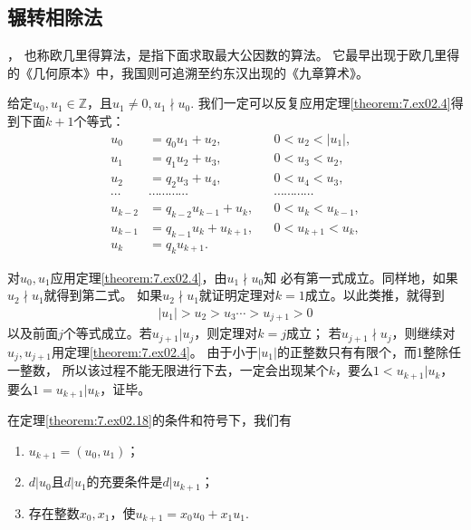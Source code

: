 \subsection*{辗转相除法}
，
也称{\sffamily 欧几里得算法}，是指下面求取最大公因数的算法。
它最早出现于欧几里得的《几何原本》中，我国则可追溯至约东汉出现的《九章算术》。
\begin{theorem}\label{theorem:7.ex02.18}
    给定$u_0,u_1\in\mathbb{Z}$，且$u_1\neq0,u_1\nmid u_0$.
    我们一定可以反复应用定理\ref{theorem:7.ex02.4}得到下面$k+1$个等式：
    \begin{align}\label{eq:7.ex02.EuclideanAlgorithm}
        u_0     & =q_0u_1+u_2,             &  & 0<u_2<|u_1|,\nonumber    \\
        u_1     & =q_1u_2+u_3,             &  & 0<u_3<u_2,\nonumber      \\
        u_2     & =q_2u_3+u_4,             &  & 0<u_4<u_3,\nonumber      \\
        \cdots  & \cdots\cdots\cdots\cdots &  & \cdots\cdots\cdots\cdots \\
        u_{k-2} & =q_{k-2}u_{k-1}+u_k,     &  & 0<u_k<u_{k-1},\nonumber  \\
        u_{k-1} & =q_{k-1}u_k+u_{k+1},     &  & 0<u_{k+1}<u_k,\nonumber  \\
        u_k     & =q_ku_{k+1}.             &  & \nonumber
    \end{align}
\end{theorem}
\begin{prove}
    对$u_0,u_1$应用定理\ref{theorem:7.ex02.4}，由$u_1\nmid u_0$知
    必有第一式成立。同样地，如果$u_2\nmid u_1$就得到第二式。
    如果$u_2\nmid u_1$就证明定理对$k=1$成立。以此类推，就得到
    \begin{align}
        |u_1|>u_2>u_3\cdots>u_{j+1}>0
    \end{align}
    以及前面$j$个等式成立。若$u_{j+1}|u_j$，则定理对$k=j$成立；
    若$u_{j+1}\nmid u_j$，则继续对$u_j,u_{j+1}$用定理\ref{theorem:7.ex02.4}。
    由于小于$|u_1|$的正整数只有有限个，而1整除任一整数，
    所以该过程不能无限进行下去，一定会出现某个$k$，要么$1<u_{k+1}|u_k$，
    要么$1=u_{k+1}|u_k$，证毕。
\end{prove}
\begin{theorem}\label{theorem:7.ex02.19}
    在定理\ref{theorem:7.ex02.18}的条件和符号下，我们有
    \begin{enumerate}
        \item $u_{k+1}=(u_0,u_1)$；
        \item $d|u_0$且$d|u_1$的充要条件是$d|u_{k+1}$；
        \item 存在整数$x_0,x_1$，使$u_{k+1}=x_0u_0+x_1u_1$.
    \end{enumerate}
\end{theorem}
